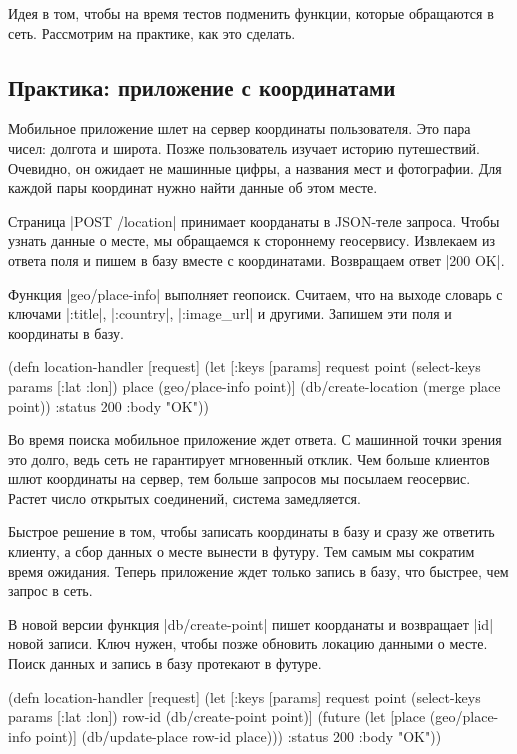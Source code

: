 Идея в том, чтобы на время тестов подменить функции, которые обращаются в
сеть. Рассмотрим на практике, как это сделать.

\subsection{Практика: приложение с координатами}

Мобильное приложение шлет на сервер координаты пользователя. Это пара чисел:
долгота и широта. Позже пользователь изучает историю путешествий. Очевидно, он
ожидает не машинные цифры, а названия мест и фотографии. Для каждой пары
координат нужно найти данные об этом месте.

Страница \spverb|POST /location| принимает коорданаты в JSON-теле запроса. Чтобы
узнать данные о месте, мы обращаемся к стороннему геосервису. Извлекаем из
ответа поля и пишем в базу вместе с координатами. Возвращаем ответ \spverb|200 OK|.

Функция \spverb|geo/place-info| выполняет геопоиск. Считаем, что на выходе
словарь с ключами \spverb|:title|, \spverb|:country|, \spverb|:image_url| и
другими. Запишем эти поля и координаты в базу.

\begin{english}
  \begin{clojure}
(defn location-handler [request]
  (let [{:keys [params]} request
        point (select-keys params [:lat :lon])
        place (geo/place-info point)]
    (db/create-location (merge place point))
    {:status 200 :body "OK"}))
  \end{clojure}
\end{english}

Во время поиска мобильное приложение ждет ответа. С машинной точки зрения это
долго, ведь сеть не гарантирует мгновенный отклик. Чем больше клиентов шлют
координаты на сервер, тем больше запросов мы посылаем геосервис. Растет число
открытых соединений, система замедляется.

Быстрое решение в том, чтобы записать координаты в базу и сразу же ответить
клиенту, а сбор данных о месте вынести в футуру. Тем самым мы сократим время
ожидания. Теперь приложение ждет только запись в базу, что быстрее, чем запрос в
сеть.

В новой версии функция \spverb|db/create-point| пишет коорданаты и возвращает
\spverb|id| новой записи. Ключ нужен, чтобы позже обновить локацию данными о
месте. Поиск данных и запись в базу протекают в футуре.

\begin{english}
  \begin{clojure}
(defn location-handler
  [request]
  (let [{:keys [params]} request
        point (select-keys params [:lat :lon])
        row-id (db/create-point point)]
    (future
      (let [place (geo/place-info point)]
        (db/update-place row-id place)))
    {:status 200 :body "OK"}))
  \end{clojure}
\end{english}

